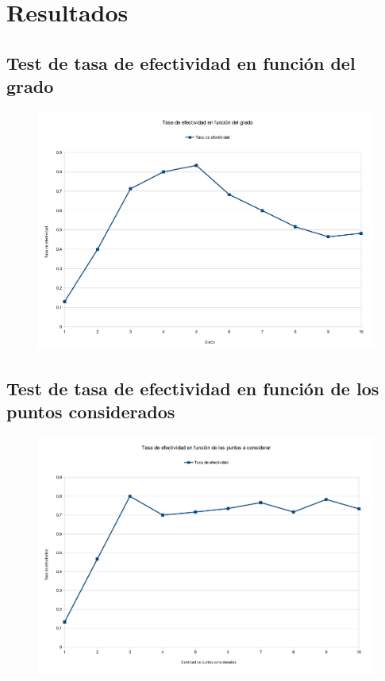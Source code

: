 \section{Resultados}

\subsection{Test de tasa de efectividad en función del grado}
\begin{figure}[H]{}
\centering
\includegraphics[scale=0.5]{graphs/TEvsGrado.pdf}
\label{TEvsGrado}
\end{figure}

\subsection{Test de tasa de efectividad en función de los puntos considerados}
\begin{figure}[H]{}
\centering
\includegraphics[scale=0.5]{graphs/TEvsMediciones.pdf}
\label{TEvsPac}
\end{figure}

